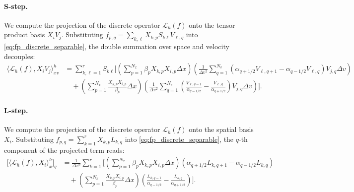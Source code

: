\documentclass[]{article}
\numberwithin{equation}{section}
\begin{document}
\paragraph{S-step.}
We compute the projection of the discrete operator $\mathcal{L}_h(f)$ onto the tensor product basis $X_i V_j$. Substituting $f_{p,q} = \sum_{k,\ell} X_{k,p} S_{k\ell} V_{\ell,q}$ into \eqref{eq:fp_discrete_separable}, the double summation over space and velocity decouples:
\begin{equation}
\begin{aligned}
    \big\langle \mathcal{L}_{h}(f), X_i V_j \big\rangle_{xv}^h
    &= \sum_{k,\ell=1}^r S_{k\ell} \Bigg[
    \left(\sum_{p=1}^{N_x} \beta_p X_{k,p} X_{i,p} \Delta x\right) \left( \frac{1}{\Delta v^2}\sum_{q=1}^{N_v} \left( \alpha_{q+1/2} V_{\ell,q+1} - \alpha_{q-1/2} V_{\ell,q} \right)V_{j,q}\Delta v \right) \\
    &\quad + \left(\sum_{p=1}^{N_x} \frac{X_{k,p} X_{i,p}}{\beta_p} \Delta x\right) \left( \frac{1}{\Delta v^2}\sum_{q=1}^{N_v} \left( \frac{V_{\ell,q-1}}{\alpha_{q-1/2}} - \frac{V_{\ell,q}}{\alpha_{q+1/2}} \right)V_{j,q}\Delta v \right)
    \Bigg].
\end{aligned}
\end{equation}

\paragraph{L-step.}
We compute the projection of the discrete operator $\mathcal{L}_h(f)$  onto the spatial basis $X_i$. Substituting $f_{p,q} = \sum_{k=1}^r X_{k,p} L_{k,q}$ into \eqref{eq:fp_discrete_separable}, the $q$-th component of the projected term reads:
\begin{equation}
\begin{aligned}
    \Big[\langle \mathcal{L}_{h}(f), X_i \rangle_x^h\Big]_q
    &= \frac{1}{\Delta v^2} \sum_{k=1}^r \Bigg[
    \left(\sum_{p=1}^{N_x} \beta_p X_{k,p} X_{i,p} \Delta x\right) \left( \alpha_{q+1/2} L_{k,q+1} - \alpha_{q-1/2} L_{k,q} \right) \\
    &\quad + \left(\sum_{p=1}^{N_x} \frac{X_{k,p} X_{i,p}}{\beta_p} \Delta x\right) \left( \frac{L_{k,q-1}}{\alpha_{q-1/2}} - \frac{L_{k,q}}{\alpha_{q+1/2}} \right)
    \Bigg].
\end{aligned}
\end{equation}
\end{document}

